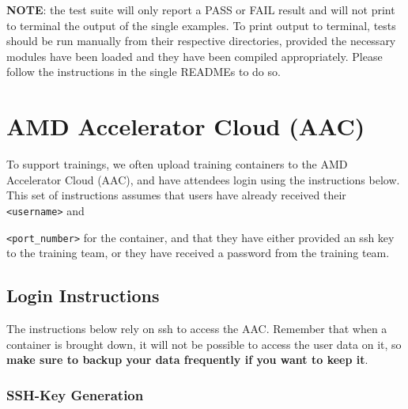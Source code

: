 \documentclass[
]{article}
\let\oldtexttt\texttt
\renewcommand{\texttt}[1]{
  \colorbox{Light}{\oldtexttt{#1}}
}
\begin{document}
\textbf{NOTE}: the test suite will only report a PASS or FAIL result and will not print to terminal the output of the single examples. To print output to terminal, tests should be run manually from their respective
directories, provided the necessary modules have been loaded and they
have been compiled appropriately. Please follow the instructions in the single READMEs to do so.



\pagebreak

\hypertarget{amd-accelerator-cloud-aac}{%
\section{AMD Accelerator Cloud (AAC)}\label{amd-accelerator-cloud-aac}}

To support trainings, we often upload training containers to the AMD
Accelerator Cloud (AAC), and have attendees login using the instructions
below. This set of instructions assumes that users have already received
their \texttt{\textless{}username\textgreater{}} and
\texttt{\textless{}port\_number\textgreater{}} for the container, and
that they have either provided an ssh key to the training team, or they
have received a password from the training team.

\hypertarget{login-instructions}{%
\subsection{Login Instructions}\label{login-instructions}}

The instructions below rely on ssh to access the AAC. Remember that when
a container is brought down, it will not be possible to access the user
data on it, so {\textbf{make sure to backup your data frequently if you want to
keep it}}.

\hypertarget{ssh-key-generation}{%
\subsubsection{SSH-Key Generation}\label{ssh-key-generation}}
\end{document}
